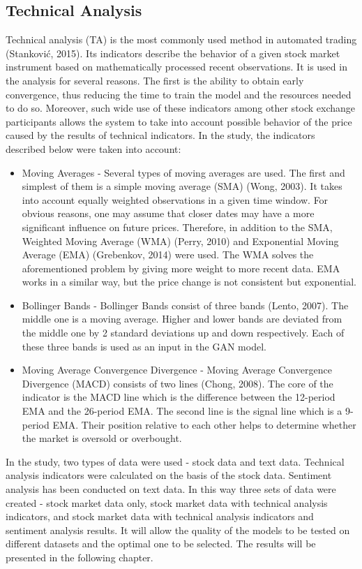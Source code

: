 \documentclass[review]{elsarticle} %
\begin{document}
\subsection{Technical Analysis}
Technical analysis (TA) is the most commonly used method in automated trading (Stanković, 2015). Its indicators describe the behavior of a given stock market instrument based on mathematically processed recent observations. It is used in the analysis for several reasons. The first is the ability to obtain early convergence, thus reducing the time to train the model and the resources needed to do so. Moreover, such wide use of these indicators among other stock exchange participants allows the system to take into account possible behavior of the price caused by the results of technical indicators. In the study, the indicators described below were taken into account: 
\begin{itemize}
\item Moving Averages - Several types of moving averages are used. The first and simplest of them is a simple moving average (SMA) (Wong, 2003). It takes into account equally weighted observations in a given time window. For obvious reasons, one may assume that closer dates may have a more significant influence on future prices. Therefore, in addition to the SMA, Weighted Moving Average (WMA) (Perry, 2010) and Exponential Moving Average (EMA) (Grebenkov, 2014) were used. The WMA solves the aforementioned problem by giving more weight to more recent data. EMA works in a similar way, but the price change is not consistent but exponential.

\item Bollinger Bands - Bollinger Bands consist of three bands (Lento, 2007). The middle one is a moving average. Higher and lower bands are deviated from the middle one by 2 standard deviations up and down respectively. Each of these three bands is used as an input in the GAN model.

\item Moving Average Convergence Divergence - Moving Average Convergence Divergence (MACD) consists of two lines (Chong, 2008). The core of the indicator is the MACD line which is the difference between the 12-period EMA and the 26-period EMA. The second line is the signal line which is a 9-period EMA. Their position relative to each other helps to determine whether the market is oversold or overbought.
\end{itemize}

In the study, two types of data were used - stock data and text data. Technical analysis indicators were calculated on the basis of the stock data. Sentiment analysis has been conducted on text data. In this way three sets of data were created - stock market data only, stock market data with technical analysis indicators, and stock market data with technical analysis indicators and sentiment analysis results. It will allow the quality of the models to be tested on different datasets and the optimal one to be selected. The results will be presented in the following chapter. 
\end{document}
